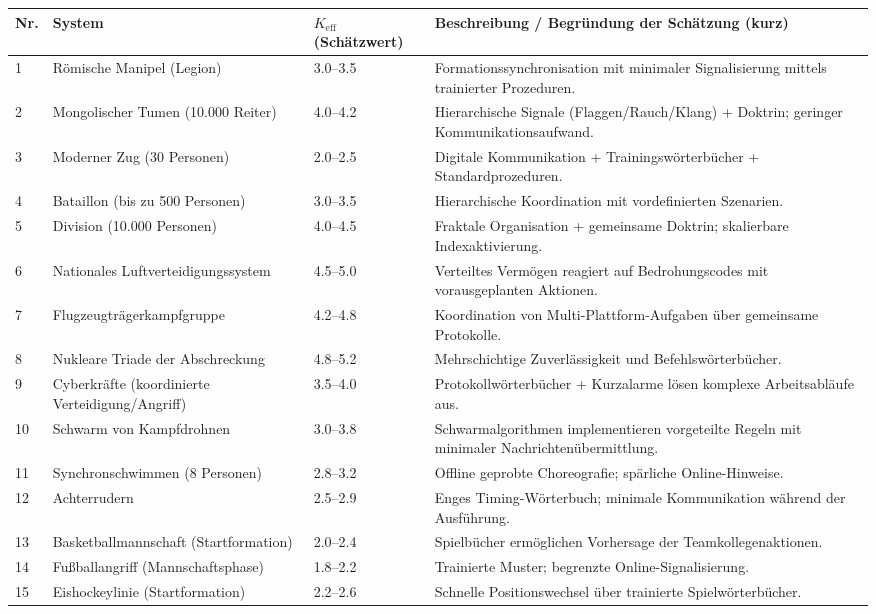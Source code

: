 \documentclass[13pt,a4paper]{article}
\newcommand{\Keff}{K_{\mathrm{eff}}}
\begin{document}
	\begin{longtable}{|p{0.8cm}|p{6.2cm}|p{3.0cm}|p{5.7cm}|}
		\hline
		\textbf{Nr.} & \textbf{System} & \textbf{$\Keff$ (Schätzwert)} & \textbf{Beschreibung / Begründung der Schätzung (kurz)} \\
		\hline
		\endhead
		1 & Römische Manipel (Legion) & 3.0--3.5 & Formationssynchronisation mit minimaler Signalisierung mittels trainierter Prozeduren. \\
		2 & Mongolischer Tumen (10.000 Reiter) & 4.0--4.2 & Hierarchische Signale (Flaggen/Rauch/Klang) + Doktrin; geringer Kommunikationsaufwand. \\
		3 & Moderner Zug (30 Personen) & 2.0--2.5 & Digitale Kommunikation + Trainingswörterbücher + Standardprozeduren. \\
		4 & Bataillon (bis zu 500 Personen) & 3.0--3.5 & Hierarchische Koordination mit vordefinierten Szenarien. \\
		5 & Division (10.000 Personen) & 4.0--4.5 & Fraktale Organisation + gemeinsame Doktrin; skalierbare Indexaktivierung. \\
		6 & Nationales Luftverteidigungssystem & 4.5--5.0 & Verteiltes Vermögen reagiert auf Bedrohungscodes mit vorausgeplanten Aktionen. \\
		7 & Flugzeugträgerkampfgruppe & 4.2--4.8 & Koordination von Multi-Plattform-Aufgaben über gemeinsame Protokolle. \\
		8 & Nukleare Triade der Abschreckung & 4.8--5.2 & Mehrschichtige Zuverlässigkeit und Befehlswörterbücher. \\
		9 & Cyberkräfte (koordinierte Verteidigung/Angriff) & 3.5--4.0 & Protokollwörterbücher + Kurzalarme lösen komplexe Arbeitsabläufe aus. \\
		10 & Schwarm von Kampfdrohnen & 3.0--3.8 & Schwarmalgorithmen implementieren vorgeteilte Regeln mit minimaler Nachrichtenübermittlung. \\
		11 & Synchronschwimmen (8 Personen) & 2.8--3.2 & Offline geprobte Choreografie; spärliche Online-Hinweise. \\
		12 & Achterrudern & 2.5--2.9 & Enges Timing-Wörterbuch; minimale Kommunikation während der Ausführung. \\
		13 & Basketballmannschaft (Startformation) & 2.0--2.4 & Spielbücher ermöglichen Vorhersage der Teamkollegenaktionen. \\
		14 & Fußballangriff (Mannschaftsphase) & 1.8--2.2 & Trainierte Muster; begrenzte Online-Signalisierung. \\
		15 & Eishockeylinie (Startformation) & 2.2--2.6 & Schnelle Positionswechsel über trainierte Spielwörterbücher. \\

\end{longtable}
\end{document}
